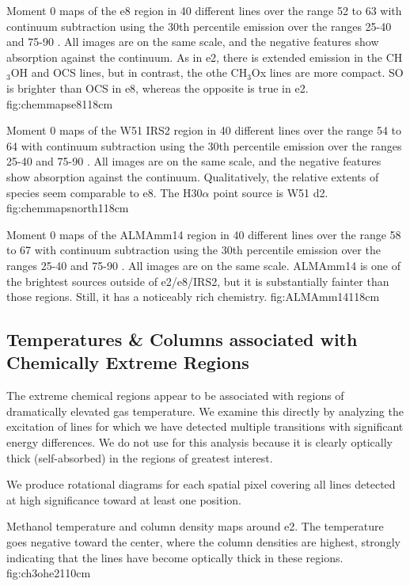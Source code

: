 \documentclass{aa}
\begin{document}
{Moment 0 maps of the e8 region in 40 different lines over the range 52 to 63
\kms with continuum subtraction using the 30th percentile emission
over the ranges 25-40 and 75-90 \kms.  All images are on the same scale, and
the negative features show absorption against the continuum.  As in e2,
there is extended emission in the CH$_3$OH and OCS lines, but in contrast,
the othe CH$_3$Ox lines are more compact. SO is brighter than OCS in e8, 
whereas the opposite is true in e2.
}{fig:chemmapse8}{1}{18cm}

{Moment 0 maps of the W51 IRS2 region in 40 different lines over the range 54 to 64
\kms with continuum subtraction using the 30th percentile emission
over the ranges 25-40 and 75-90 \kms.  All images are on the same scale, and
the negative features show absorption against the continuum.  Qualitatively,
 the relative extents of species seem comparable to e8.  The H30$\alpha$ 
 point source is W51 d2.
}{fig:chemmapsnorth}{1}{18cm}

{Moment 0 maps of the ALMAmm14 region in 40 different lines over the range 58 to 67
\kms with continuum subtraction using the 30th percentile emission
over the ranges 25-40 and 75-90 \kms.  All images are on the same scale. 
ALMAmm14 is one of the brightest sources outside of e2/e8/IRS2, but
it is substantially fainter than those regions.  Still, it has a noticeably
rich chemistry.
}{fig:ALMAmm14}{1}{18cm}

\subsection{Temperatures \& Columns associated with Chemically Extreme Regions}
The extreme chemical regions appear to be associated with regions of
dramatically elevated gas temperature.  We examine this directly by analyzing
the excitation of lines for which we have detected multiple transitions with
significant energy differences.  We do not use \formaldehyde for this analysis
because it is clearly optically thick (self-absorbed) in the regions of
greatest interest.

We produce rotational diagrams for each spatial pixel covering all \methanol lines
detected at high significance toward at least one position.

{Methanol temperature and column density maps around e2.  The temperature goes
negative toward the center, where the column densities are highest, strongly
indicating that the lines have become optically thick in these regions.}
{fig:ch3ohe2}{1}{10cm}
 
\end{document}
